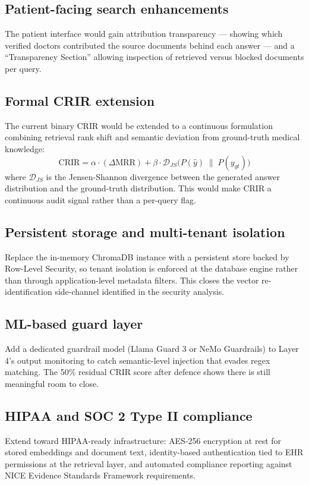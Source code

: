 \subsection{Patient-facing search enhancements}
The patient interface would gain attribution transparency --- showing which verified doctors contributed the source documents behind each answer --- and a ``Transparency Section'' allowing inspection of retrieved versus blocked documents per query.

\subsection{Formal CRIR extension}
The current binary CRIR would be extended to a continuous formulation combining retrieval rank shift and semantic deviation from ground-truth medical knowledge:
\begin{equation}
\text{CRIR} = \alpha \cdot (\Delta\text{MRR}) + \beta \cdot \mathcal{D}_{JS}\bigl(P(\hat{y}) \;\|\; P(y_{gt})\bigr)
\end{equation}
where $\mathcal{D}_{JS}$ is the Jensen-Shannon divergence between the generated answer distribution and the ground-truth distribution. This would make CRIR a continuous audit signal rather than a per-query flag.

\subsection{Persistent storage and multi-tenant isolation}
Replace the in-memory ChromaDB instance with a persistent store backed by Row-Level Security, so tenant isolation is enforced at the database engine rather than through application-level metadata filters. This closes the vector re-identification side-channel identified in the security analysis.

\subsection{ML-based guard layer}
Add a dedicated guardrail model (Llama Guard 3 or NeMo Guardrails) to Layer 4's output monitoring to catch semantic-level injection that evades regex matching. The 50\% residual CRIR score after defence shows there is still meaningful room to close.

\subsection{HIPAA and SOC 2 Type II compliance}
Extend toward HIPAA-ready infrastructure: AES-256 encryption at rest for stored embeddings and document text, identity-based authentication tied to EHR permissions at the retrieval layer, and automated compliance reporting against NICE Evidence Standards Framework requirements.

